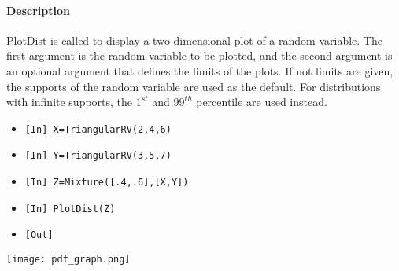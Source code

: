 \documentclass[11pt,epsfig,psfig,doublespace,singlespace]{article}
\begin{document}
\paragraph{Description} PlotDist is called to display a two-dimensional plot of a random variable. The first argument is the random variable to be plotted, and the second argument is an optional argument that defines the limits of the plots. If not limits are given, the supports of the random variable are used as the default. For distributions with infinite supports, the $1^{st}$ and $99^{th}$ percentile are used instead.
\begin{itemize}
\item \texttt{[In] X=TriangularRV(2,4,6)}
\item \texttt{[In] Y=TriangularRV(3,5,7)}
\item \texttt{[In] Z=Mixture([.4,.6],[X,Y])}
\item \texttt{[In] PlotDist(Z)}
\item \texttt{[Out]}
\end{itemize}
\texttt{[image: pdf\_graph.png]} 
\end{document}
